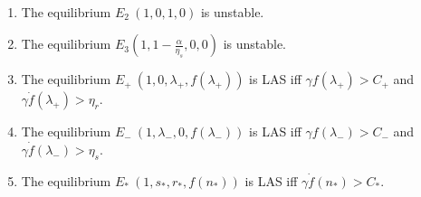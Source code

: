 \begin{theo}

\ 	\begin{enumerate}
		\item The equilibrium \( E_2 \ (1, 0, 1, 0) \) is unstable.
		\item The equilibrium \( E_3 \left(1, 1 - \frac{\alpha}{\eta_s}, 0, 0\right) \) is unstable.
		\item The equilibrium \( E_+ \ (1, 0, \lambda_+, f(\lambda_+) ) \) is LAS iff $\gamma f(\lambda_+)> C_+$ and $\gamma \dot f(\lambda_+)> \eta_r$.
		\item The equilibrium 
		\( E_- \ (1, \lambda_-, 0, f(\lambda_-)) \) is LAS iff $\gamma f(\lambda_-)>C_- $ and 
		$\gamma \dot f(\lambda_-)>\eta_s$.
		\item The equilibrium \( E_* \ (1, s_*, r_*, f(n_*) ) \) is LAS iff $\gamma \dot f(n_*)>C_*$.
	\end{enumerate}
\end{theo}
